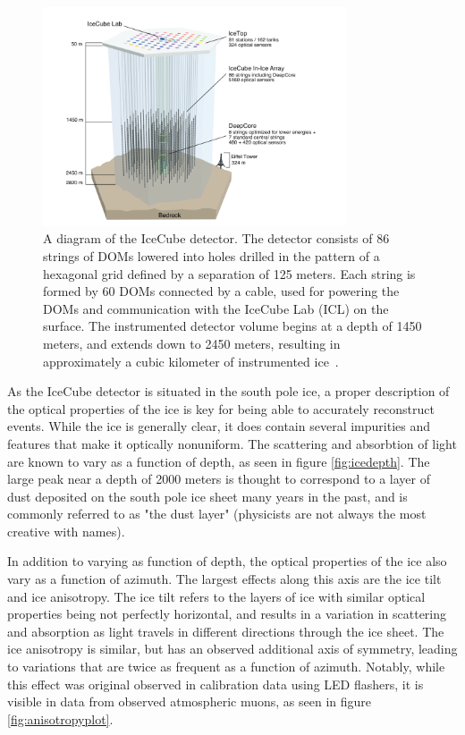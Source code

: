 \begin{figure}[h]
\centering
\includegraphics[width=0.8\textwidth]{figs/icdiagram.png}
\caption{A diagram of the IceCube detector. The detector consists of 86 strings of DOMs lowered into holes drilled in the pattern of a hexagonal grid defined by a separation of 125 meters. Each string is formed by 60 DOMs connected by a cable, used for powering the DOMs and communication with the IceCube Lab (ICL) on the surface. The instrumented detector volume begins at a depth of 1450 meters, and extends down to 2450 meters, resulting in approximately a cubic kilometer of instrumented ice~\cite{det_paper}. }
\label{fig:icecubediagram}
\end{figure}

As the IceCube detector is situated in the south pole ice, a proper description of the optical properties of the ice is key for being able to accurately reconstruct events. While the ice is generally clear, it does contain several impurities and features that make it optically nonuniform. The scattering and absorbtion of light are known to vary as a function of depth, as seen in figure \ref{fig:icedepth}. The large peak near a depth of 2000 meters is thought to correspond to a layer of dust deposited on the south pole ice sheet many years in the past, and is commonly referred to as "the dust layer" (physicists are not always the most creative with names). 

In addition to varying as function of depth, the optical properties of the ice also vary as a function of azimuth. The largest effects along this axis are the ice tilt and ice anisotropy. The ice tilt refers to the layers of ice with similar optical properties being not perfectly horizontal, and results in a variation in scattering and absorption as light travels in different directions through the ice sheet. The ice anisotropy is similar, but has an observed additional axis of symmetry, leading to variations that are twice as frequent as a function of azimuth. Notably, while this effect was original observed in calibration data using LED flashers, it is visible in data from observed atmospheric muons, as seen in figure \ref{fig:anisotropyplot}. 

